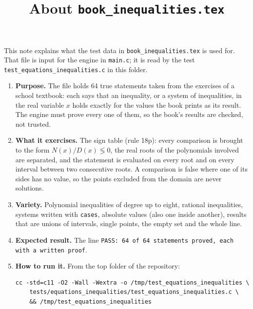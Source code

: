 \documentclass[11pt,a4paper]{article}
\title{About \texttt{book\_inequalities.tex}}
\author{}
\date{}
\begin{document}
\maketitle
This note explains what the test data in \texttt{book\_inequalities.tex} is used for. That file is input for the engine in \texttt{main.c}; it is read by the test \texttt{test\_equations\_inequalities.c} in this folder.

\begin{enumerate}
\item \textbf{Purpose.} The file holds 64 true statements taken from the exercises of a school textbook: each says that an inequality, or a system of inequalities, in the real variable $x$ holds exactly for the values the book prints as its result. The engine must prove every one of them, so the book's results are checked, not trusted.

\item \textbf{What it exercises.} The sign table (rule 18p): every comparison is brought to the form $N(x)/D(x) \lessgtr 0$, the real roots of the polynomials involved are separated, and the statement is evaluated on every root and on every interval between two consecutive roots. A comparison is false where one of its sides has no value, so the points excluded from the domain are never solutions.

\item \textbf{Variety.} Polynomial inequalities of degree up to eight, rational inequalities, systems written with \texttt{cases}, absolute values (also one inside another), results that are unions of intervals, single points, the empty set and the whole line.

\item \textbf{Expected result.} The line \texttt{PASS: 64 of 64 statements proved, each with a written proof}.

\item \textbf{How to run it.} From the top folder of the repository:
\begin{verbatim}
cc -std=c11 -O2 -Wall -Wextra -o /tmp/test_equations_inequalities \
    tests/equations_inequalities/test_equations_inequalities.c \
    && /tmp/test_equations_inequalities
\end{verbatim}
\end{enumerate}
\end{document}

